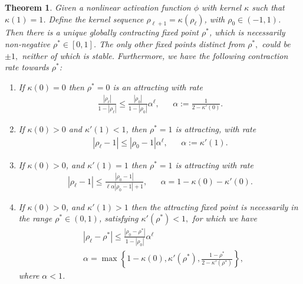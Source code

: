 \documentclass[twoside]{article}
\newtheorem{theorem}{Theorem}
\theoremstyle{definition}
\newcommand{\thomas}[1]{{\color{blue}\textit{#1}}}
\begin{document}
\begin{theorem}
\label{thm:global_attract}
Given a nonlinear activation function $\phi$ with kernel  $\kappa$ such that $\kappa(1)=1$. Define the kernel sequence $\rho_{\ell+1}=\kappa(\rho_\ell)$, with $\rho_0 \in (-1,1)$. Then there is a unique globally contracting fixed point $\rho^*$, which is necessarily non-negative $\rho^*\in[0,1]$. The only other fixed points distinct from $\rho^*,$ could be $\pm 1,$ neither of which is stable. Furthermore, we have the following contraction rate towards $\rho^*$:
\begin{enumerate}
    \item If $\kappa(0)=0$ then $\rho^*=0$ is an attracting with rate 
    \begin{align*}
    \frac{|\rho_\ell|}{1-|\rho_\ell|} \le \frac{|\rho_0|}{1-|\rho_0|} \alpha^\ell, && \alpha:=\frac{1}{2-\kappa'(0)}.
    \end{align*}
    \item If $\kappa(0)>0$ and $\kappa'(1)<1$, then $\rho^*=1$ is attracting, with rate 
    \begin{align*}
    |\rho_\ell-1| \le |\rho_0-1| \alpha ^\ell, && \alpha := \kappa'(1).
    \end{align*}
    \item If $\kappa(0) > 0$, and $\kappa'(1)=1$ then  $\rho^*=1$ is attracting with rate 
    \begin{align*}
    |\rho_\ell-1| \le \frac{|\rho_0-1|}{\ell\alpha|\rho_0-1|+1}, && \alpha = 1-\kappa(0)-\kappa'(0).
    \end{align*}
    \item If $\kappa(0) > 0$, and $\kappa'(1)>1$ then the attracting fixed point is necessarily in the range $\rho^*\in(0,1)$, satisfying $\kappa'(\rho^*) < 1,$ for which we have  
    \begin{align*}
    &|\rho_\ell-\rho^*| \le \frac{|\rho_0-\rho^*|}{1-|\rho_0|}\alpha^\ell \\ &\alpha = \max\left\{1-\kappa(0),\kappa'(\rho^*),\frac{1-\rho^*}{2-\kappa'(\rho^*)}\right\},
    \end{align*}
    where $\alpha<1$.
\end{enumerate}
\end{theorem}
\end{document}
